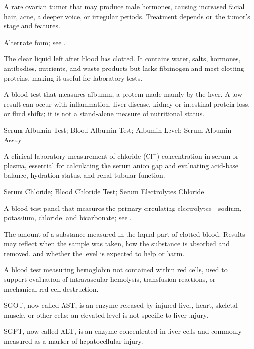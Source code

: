  A rare ovarian tumor that may produce male hormones, causing increased facial hair, acne, a deeper voice, or irregular periods. Treatment depends on the tumor's stage and features.

 Alternate form; see .

 The clear liquid left after blood has clotted. It contains water, salts, hormones, antibodies, nutrients, and waste products but lacks fibrinogen and most clotting proteins, making it useful for laboratory tests.

 A blood test that measures albumin, a protein made mainly by the liver. A low result can occur with inflammation, liver disease, kidney or intestinal protein loss, or fluid shifts; it is not a stand-alone measure of nutritional status.

\synonyms
Serum Albumin Test; Blood Albumin Test; Albumin Level; Serum Albumin Assay

 A clinical laboratory measurement of chloride ($\text{Cl}^-$) concentration in serum or plasma, essential for calculating the serum anion gap and evaluating acid-base balance, hydration status, and renal tubular function.

\synonyms
Serum Chloride; Blood Chloride Test; Serum Electrolytes Chloride

 A blood test panel that measures the primary circulating electrolytes—sodium, potassium, chloride, and bicarbonate; see .

 The amount of a substance measured in the liquid part of clotted blood. Results may reflect when the sample was taken, how the substance is absorbed and removed, and whether the level is expected to help or harm.

 A blood test measuring hemoglobin not contained within red cells, used to support evaluation of intravascular hemolysis, transfusion reactions, or mechanical red-cell destruction.

 SGOT, now called AST, is an enzyme released by injured liver, heart, skeletal muscle, or other cells; an elevated level is not specific to liver injury.

 SGPT, now called ALT, is an enzyme concentrated in liver cells and commonly measured as a marker of hepatocellular injury.

